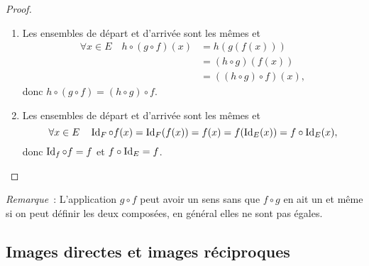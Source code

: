 \begin{proof}
    \begin{enumerate}
        \item Les ensembles de départ et d'arrivée sont les mêmes et 
            \begin{align}
                \forall x \in E \quad h \circ (g \circ f)(x) &=h(g(f(x))) \\ 
                                                             &=(h \circ g)(f(x)) \\ 
                                                             &=((h \circ g) 
                                                             \circ f)(x),
            \end{align}
            donc \(h \circ (g \circ f)=(h \circ g) \circ f\).
        \item Les ensembles de départ et d'arrivée sont les mêmes et 
            \begin{equation}
                \forall x \in E \quad \operatorname{Id}_F \circ 
                f(x)=\operatorname{Id}_F(f(x))=f(x)=f(\operatorname{Id}_E(x))=f \circ \operatorname{Id}_E(x),
            \end{equation}
            donc \(\operatorname{Id}_f \circ f = f\) et \(f \circ \operatorname{Id}_E=f\).
    \end{enumerate}
\end{proof}
\emph{Remarque}~: L'application \(g \circ f\) peut avoir un sens sans que \(f 
\circ g\) en ait un et même si on peut définir les deux composées, en général 
elles ne sont pas égales.
\subsection{Images directes et images réciproques}
\label{chap3-subsec:imagesdirecteetrec}
